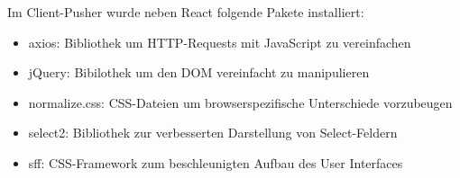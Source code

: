         Im Client-Pusher wurde neben React folgende Pakete installiert:
        
        \begin{itemize}
            \item axios: Bibliothek um HTTP-Requests mit JavaScript zu vereinfachen
            \item jQuery: Bibilothek um den DOM vereinfacht zu manipulieren
            \item normalize.css: CSS-Dateien um browserspezifische Unterschiede vorzubeugen
            \item select2: Bibliothek zur verbesserten Darstellung von Select-Feldern
            \item sff: CSS-Framework zum beschleunigten Aufbau des User Interfaces
        \end{itemize}